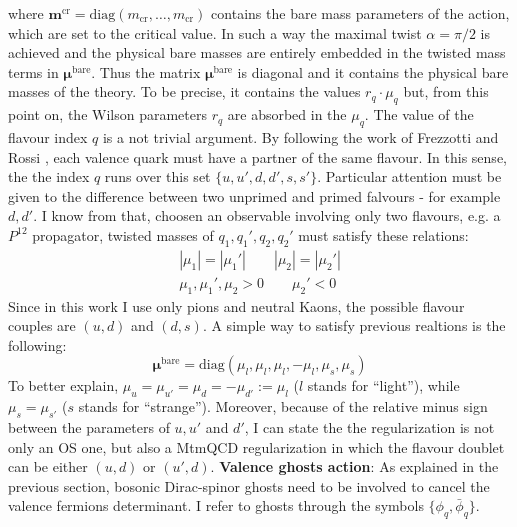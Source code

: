 \documentclass[english, LaM, oneside, noexaminfo]{sapthesis}
\newcommand{\bare}{^{\text{bare}}}
\begin{document}
where $\boldsymbol{m}^\text{cr}=\text{diag} (m_\text{cr},\dots,m_\text{cr})$ contains the bare mass parameters of the action, which are set to the critical value.
In such a way the maximal twist $\alpha = \pi/2$ is achieved and the physical bare masses are entirely embedded in the twisted mass terms in $\boldsymbol{\mu}\bare$.
Thus the matrix $\boldsymbol{\mu}\bare$ is diagonal and it contains the physical bare masses of the theory.
To be precise, it contains the values $r_q\cdot \mu_q$ but, from this point on, the Wilson parameters $r_q$ are absorbed in the $\mu_q$.
\newline
The value of the flavour index $q$ is a not trivial argument.
By following the work of Frezzotti and Rossi \cite{FR2}, each valence quark must have a partner of the same flavour.
In this sense, the the index $q$ runs over this set $\{u,u',d,d',s,s'\}$.
Particular attention must be given to the difference between two unprimed and primed falvours - for example $d,d'$.
I know from \cite{FR2} that, choosen an observable involving only two flavours, e.g. a $P^{12}$ propagator, twisted masses of  $q_1,q_1',q_2,q_2'$ must satisfy these relations:
\begin{equation*}
    \begin{gathered}
        |\mu_1| = |\mu_1 '| \qquad |\mu_2| = |\mu_2 '| \\
        \mu_1, \mu_1 ', \mu_2 > 0 \qquad \mu_2 '<0
    \end{gathered}
\end{equation*}
Since in this work I use only pions and neutral Kaons, the possible flavour couples are $(u,d)$ and $(d,s)$.
A simple way to satisfy previous realtions is the following:
\begin{equation*}
    \boldsymbol{\mu}\bare = \text{diag}\left(\mu_l,\mu_l,\mu_l,-\mu_l,\mu_s,\mu_s\right)
\end{equation*}
To better explain, $\mu_u = \mu_{u'} = \mu_d = -\mu_{d'} := \mu_l$ ($l$ stands for ``light''), while $\mu_s = \mu_{s'}$ ($s$ stands for ``strange'').
Moreover, because of the relative minus sign between the parameters of $u,u'$ and $d'$, I can state the the regularization is not only an OS one, but also a MtmQCD regularization in which the flavour doublet can be either $(u,d)$ or $(u',d)$.
\newline\newline
{\bf Valence ghosts action}:
As explained in the previous section, bosonic Dirac-spinor ghosts need to be involved to cancel the valence fermions determinant.
I refer to ghosts through the symbols $\{\phi_q,\bar\phi_q\}$.
\end{document}
